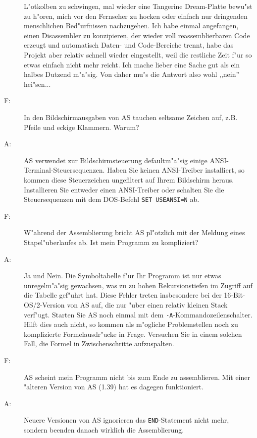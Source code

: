 \documentclass[12pt,a4paper,twoside]{report}
\newcommand{\tty}[1]{{\tt #1}}
\begin{document}
\begin{description}
{         L"otkolben zu schwingen, mal wieder eine Tangerine Dream-Platte
         bewu"st zu h"oren, mich vor den Fernseher zu hocken oder einfach
         nur dringenden menschlichen Bed"urfnissen nachzugehen.  Ich habe
         einmal angefangen, einen Disassembler zu konzipieren, der wieder
         voll reassemblierbaren Code erzeugt und automatisch Daten- und
         Code-Bereiche trennt, habe das Projekt aber relativ schnell wieder
         eingestellt, weil die restliche Zeit f"ur so etwas einfach nicht
         mehr reicht.  Ich mache lieber eine Sache gut als ein halbes
         Dutzend m"a"sig.  Von daher mu"s die Antwort also wohl ,,nein''
         hei"sen...}
\vspace{0.3cm}
\item[F:]{In den Bildschirmausgaben von AS tauchen seltsame Zeichen auf,
          z.B. Pfeile und eckige Klammern.  Warum?}
\item[A:]{AS verwendet zur Bildschirmsteuerung defaultm"a"sig einige
          ANSI-Terminal-Steuersequenzen.  Haben Sie keinen ANSI-Treiber
	  installiert, so kommen diese Steuerzeichen ungefiltert auf
	  Ihrem Bildschirm heraus.  Installieren Sie entweder einen
	  ANSI-Treiber oder schalten Sie die Steuersequenzen mit dem
	  DOS-Befehl \tty{SET USEANSI=N} ab.}
\vspace{0.3cm}
\item[F:]{W"ahrend der Assemblierung bricht AS pl"otzlich mit der
          Meldung eines Stapel"uberlaufes ab.  Ist mein Programm zu
	  kompliziert?}
\item[A:]{Ja und Nein.  Die Symboltabelle f"ur Ihr Programm ist nur
          etwas unregelm"a"sig gewachsen, was zu zu hohen Rekursionstiefen
	  im Zugriff auf die Tabelle gef"uhrt hat.  Diese Fehler treten
	  insbesondere bei der 16-Bit-OS/2-Version von AS auf, die nur
	  "uber einen relativ kleinen Stack verf"ugt.  Starten Sie AS noch
	  einmal mit dem \tty{-A}-Kommandozeilenschalter.  Hilft dies auch
          nicht, so kommen als m"ogliche Problemstellen noch zu komplizierte
          Formelausdr"ucke in Frage.  Versuchen Sie in einem solchen Fall,
          die Formel in Zwischenschritte aufzuspalten.}
\vspace{0.3cm}
\item[F:]{AS scheint mein Programm nicht bis zum Ende zu assemblieren.
          Mit einer "alteren Version von AS (1.39) hat es dagegen
	  funktioniert.}
\item[A:]{Neuere Versionen von AS ignorieren das \tty{END}-Statement nicht
          mehr, sondern beenden danach wirklich die Assemblierung.
}
\end{description}
\end{document}
